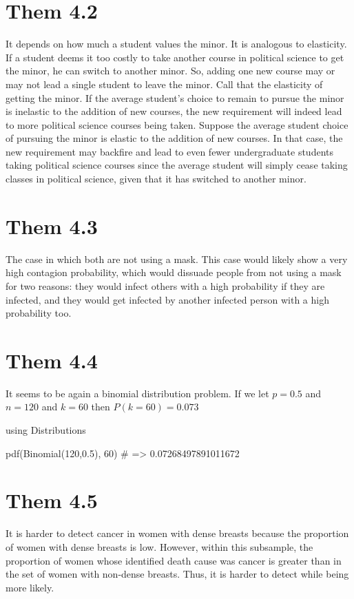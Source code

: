 \documentclass[11pt]{article}
\begin{document}
\section*{Them 4.2}
\label{sec:org4423300}
It depends on how much a student values the minor. It is analogous to elasticity. If a student deems it too costly to take another course in political science to get the minor, he can switch to another minor. So, adding one new course may or may not lead a single student to leave the minor. Call that the elasticity of getting the minor. If the average student's choice to remain to pursue the minor is inelastic to the addition of new courses, the new requirement will indeed lead to more political science courses being taken. Suppose the average student choice of pursuing the minor is elastic to the addition of new courses. In that case, the new requirement may backfire and lead to even fewer undergraduate students taking political science courses since the average student will simply cease taking classes in political science, given that it has switched to another minor.

\section*{Them 4.3}
\label{sec:org0a0e520}
The case in which both are not using a mask. This case would likely show a very high contagion probability, which would dissuade people from not using a mask for two reasons: they would infect others with a high probability if they are infected, and they would get infected by another infected person with a high probability too.

\section*{Them 4.4}
\label{sec:org00fd642}
It seems to be again a binomial distribution problem. If we let \(p  = 0.5\) and \(n = 120\) and \(k = 60\) then \(P(k=60) = 0.073\)

\begin{jllisting}
using Distributions

pdf(Binomial(120,0.5), 60) # =>    0.07268497891011672
\end{jllisting}

\section*{Them 4.5}
\label{sec:orgc0e2441}

It is harder to detect cancer in women with dense breasts because the proportion of women with dense breasts is low. However, within this subsample, the proportion of women whose identified death cause was cancer is greater than in the set of women with non-dense breasts. Thus, it is harder to detect while being more likely.
\end{document}
